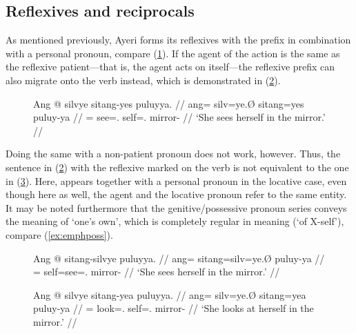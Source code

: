 \subsection{Reflexives and reciprocals}
\label{subsec:reflrec}

As mentioned previously, Ayeri forms its reflexives with the prefix 
 in combination with a personal pronoun, compare 
(\ref{ex:reflpat}). If the agent of the action is the same as the reflexive 
patient---that is, the agent acts on itself---the reflexive prefix can also 
migrate onto the verb instead, which is demonstrated in (\ref{ex:reflvb}).

\begin{figure}
\ex\label{ex:reflpat}\begingl
	\gla Ang @ silvye sitang-yes puluyya. //
	\glb ang= silv=ye.Ø sitang=yes puluy-ya //
	\glc \AgtT{}= see=\TsgF{}.\Top{} self=\TsgF{}.\Parg{} mirror-\Loc{} //
	\glft `She sees herself in the mirror.' //
\endgl\xe
\end{figure}

Doing the same with a non-patient pronoun does not work, however. Thus, the
sentence in (\ref{ex:reflvb}) with the reflexive  marked
on the verb is not equivalent to the one in (\ref{ex:reflloc}). Here,
 appears together with a personal pronoun in the locative
case, even though here as well, the agent and the locative pronoun refer to the
same entity. It may be noted furthermore that the genitive/possessive pronoun
series conveys the meaning of `one's own', which is completely regular in
meaning (`of X-self'), compare (\ref{ex:emphposs}).

\begin{figure}
\ex\label{ex:reflvb}\begingl
	\gla Ang @ sitang-silvye puluyya. //
	\glb ang= sitang=silv=ye.Ø puluy-ya //
	\glc \AgtT{}= self=see=\TsgF{}.\Top{} mirror-\Loc{} //
	\glft `She sees herself in the mirror.' //
\endgl\xe
\end{figure}

\begin{figure}
\ex\label{ex:reflloc}\begingl
	\gla Ang @ silvye sitang-yea puluyya. //
	\glb ang= silv=ye.Ø sitang=yea puluy-ya //
	\glc \AgtT{}= look=\TsgF{}.\Top{} self=\TsgF{}.\Loc{} mirror-\Loc{} //
	\glft `She looks at herself in the mirror.' //
\endgl\xe
\end{figure}

